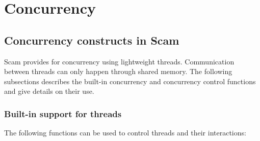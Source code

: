 \chapter{Concurrency}
\label{Concurrency}

\section{Concurrency constructs in Scam}

Scam provides for concurrency using lightweight threads. Communication between 
threads can only happen through shared memory. The following subsections describes the 
built-in concurrency and concurrency control functions and give details on 
their use.

\subsection{Built-in support for threads}


The following functions can be used to control threads and their
interactions:

